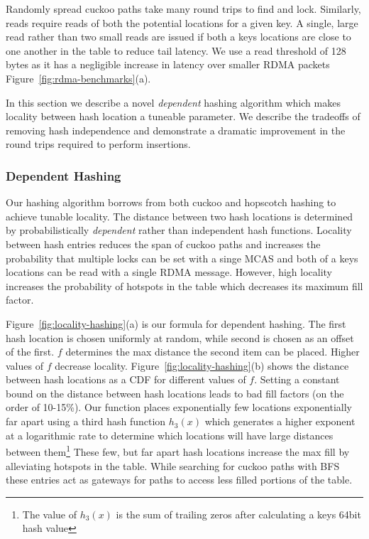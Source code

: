 Randomly spread cuckoo paths take many round trips to find and lock.
Similarly, reads require reads of both the potential locations for a
given key.  A single, large read rather than two small reads are issued
if both a keys locations are close to one another in the table to
reduce tail latency. We use a read threshold of 128 bytes as it has a
negligible increase in latency over smaller RDMA packets
Figure~\ref{fig:rdma-benchmarks}(a).


In this section we describe a novel
\textit{dependent} hashing algorithm which makes locality
between hash location a tuneable parameter. We describe the
tradeoffs of removing hash independence and demonstrate a
dramatic improvement in the round trips required to perform
insertions.


\subsubsection{Dependent Hashing}

Our hashing algorithm borrows from both cuckoo and hopscotch
hashing to achieve tunable locality. The distance between
two hash locations is determined by probabilistically
\textit{dependent} rather than independent hash functions.
Locality between hash entries reduces the span of cuckoo
paths and increases the probability that multiple locks can
be set with a singe MCAS and both of a keys locations can be read
with a single RDMA message. However, high locality increases
the probability of hotspots in the table which decreases its
maximum fill factor.

Figure~\ref{fig:locality-hashing}(a) is our formula for
dependent hashing. The first hash location is chosen
uniformly at random, while second is chosen as an offset of
the first.  $f$ determines the max distance the second item
can be placed. Higher values of $f$ decrease locality.
Figure~\ref{fig:locality-hashing}(b) shows the distance
between hash locations as a CDF for different values of $f$.
Setting a constant bound on the distance between hash
locations leads to bad fill factors (on the order of
10-15\%). Our function places exponentially few locations
exponentially far apart using a third hash function $h_3(x)$
which generates a higher exponent at a logarithmic rate to
determine which locations will have large distances between
them\footnote{The value of $h_3(x)$ is the sum of trailing
zeros after calculating a keys 64bit hash value} These few,
but far apart hash locations increase the max fill by
alleviating hotspots in the table. While searching for
cuckoo paths with BFS these entries act as gateways for
paths to access less filled portions of the table. 

